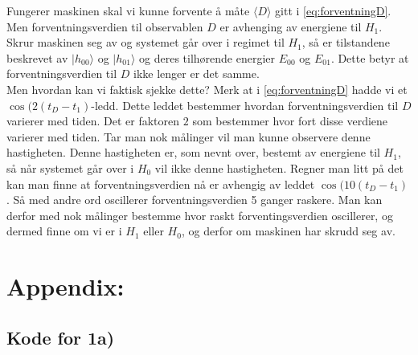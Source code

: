\documentclass[a4paper,norsk, 10pt]{article}
\numberwithin{equation}{section}
\begin{document}
Fungerer maskinen skal vi kunne forvente å måte $\langle D\rangle$ gitt i \ref{eq:forventningD}. Men forventningsverdien til observablen $D$  er avhenging av energiene til $H_1$. Skrur maskinen seg av og systemet går over i regimet til $H_1$, så er tilstandene beskrevet av $|h_{00}\rangle$ og $|h_{01}\rangle$ og deres tilhørende energier $E_{00}$ og $E_{01}$. Dette betyr at forventningsverdien til $D$ ikke lenger er det samme.\\

Men hvordan kan vi faktisk sjekke dette? Merk at i \ref{eq:forventningD} hadde vi et $\cos(2(t_D - t_1)$-ledd. Dette leddet bestemmer hvordan forventningsverdien til $D$ varierer med tiden. Det er faktoren $2$ som bestemmer hvor fort disse verdiene varierer med tiden. Tar man nok målinger vil man kunne observere denne hastigheten. Denne hastigheten er, som nevnt over, bestemt av energiene til $H_1$, så når systemet går over i $H_0$ vil ikke denne hastigheten. Regner man litt på det kan man finne at forventningsverdien nå er avhengig av leddet $\cos(10(t_D - t_1)$. Så med andre ord oscillerer forventningsverdien 5 ganger raskere. Man kan derfor med nok målinger bestemme hvor raskt forventingsverdien oscillerer, og dermed finne om vi er i $H_1$ eller $H_0$, og derfor om maskinen har skrudd seg av.

\newpage

\section{Appendix:}
\subsection*{Kode for 1a)}

\label{lst:solver}
\end{document}
